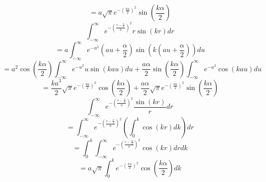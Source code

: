 \documentclass[double,12pt]{beavtex}
\begin{document}
\begin{equation}{=a\sqrt{\pi}e^{-\left(\frac{ka}{2}\right)^2}\sin(\frac{k\alpha}{2})}\end{equation} 
\[{}\]
\[{}\]
\begin{equation}{\int_{-\infty}^{\infty}{e^{-\left(\frac{r-\frac{\alpha}{2}}{a}\right)^2}r\sin(kr)d{r}}}\end{equation} 
\begin{displaymath}{=a\int_{-\infty}^{\infty}{e^{-u^2}(au+\frac{\alpha}{2})\sin(k(au+\frac{\alpha}{2}))d{u}}}\end{displaymath} 
\begin{displaymath}{=a^2\cos(\frac{k\alpha}{2})\int_{-\infty}^{\infty}{e^{-u^2}u\sin(kau)d{u} +\frac{a\alpha}{2}\sin(\frac{k\alpha}{2})\int_{-\infty}^{\infty}e^{-u^2}\cos(kau)d{u}}}\end{displaymath} 
\begin{equation}{=\frac{ka^3}{2}\sqrt{\pi}e^{-\left(\frac{ka}{2}\right)^2}\cos(\frac{k\alpha}{2})+\frac{a\alpha}{2}\sqrt{\pi}e^{-\left(\frac{ka}{2}\right)^2}\sin(\frac{k\alpha}{2})}\end{equation} 
\[{}\]
\begin{equation}{\int_{-\infty}^{\infty}{e^{-\left(\frac{r-\frac{\alpha}{2}}{a}\right)^2}\frac{\sin(kr)}{r}d{r}}}\end{equation} 
\begin{displaymath}{=\int_{-\infty}^{\infty}{e^{-\left(\frac{r-\frac{\alpha}{2}}{a}\right)^2}\left(\int_{0}^{k}{\cos(kr)d{k}}\right)d{r}}}\end{displaymath} 
\begin{displaymath}{=\int_{0}^{k}\int_{-\infty}^{\infty}{e^{-\left(\frac{r-\frac{\alpha}{2}}{a}\right)^2}{\cos(kr)d{r}}d{k}}}\end{displaymath} 
\begin{displaymath}{=a\sqrt{\pi}\int_{0}^{k}e^{-\left(\frac{ka}{2}\right)^2}\cos\left(\frac{k\alpha}{2}\right)d{k} }\end{displaymath} 
\end{document}
